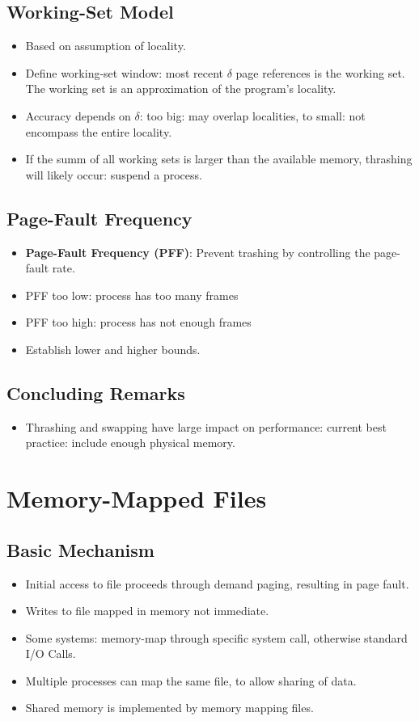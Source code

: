 \documentclass[10pt]{report}
\begin{document}
		\subsection{Working-Set Model}
			\begin{itemize}
				\item Based on assumption of locality.
				\item Define working-set window: most recent $\delta$ page references is the working set. The working set is an approximation of the program's locality.
				\item Accuracy depends on $\delta$: too big: may overlap localities, to small: not encompass the entire locality.
				\item If the summ of all working sets is larger than the available memory, thrashing will likely occur: suspend a process.
			\end{itemize}

		\subsection{Page-Fault Frequency}
			\begin{itemize}
				\item \textbf{Page-Fault Frequency (PFF)}: Prevent trashing by controlling the page-fault rate.
				\item PFF too low: process has too many frames
				\item PFF too high: process has not enough frames
				\item Establish lower and higher bounds.
			\end{itemize}

		\subsection{Concluding Remarks}
			\begin{itemize}
				\item Thrashing and swapping have large impact on performance: current best practice: include enough physical memory.
			\end{itemize}

	\section{Memory-Mapped Files}
		\subsection{Basic Mechanism}
			\begin{itemize}
				\item Initial access to file proceeds through demand paging, resulting in page fault.
				\item Writes to file mapped in memory not immediate.
				\item Some systems: memory-map through specific system call, otherwise standard I/O Calls.
				\item Multiple processes can map the same file, to allow sharing of data.
				\item Shared memory is implemented by memory mapping files.
			\end{itemize}
\end{document}
